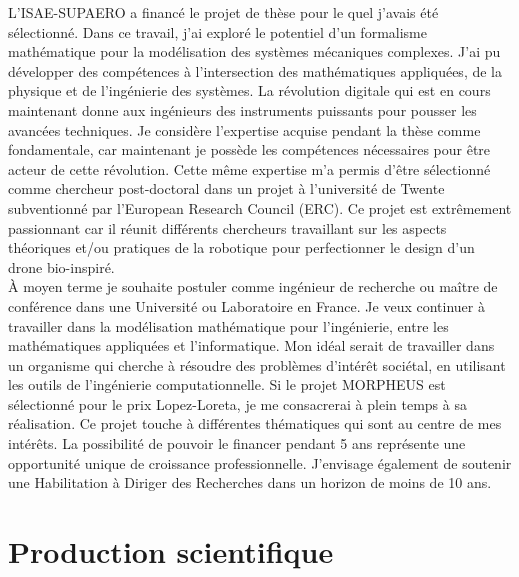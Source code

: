 \documentclass[12pt, french]{article}
\begin{document}
	L'ISAE-SUPAERO a financé le projet de thèse pour le quel j'avais été sélectionné. Dans ce travail, j'ai exploré le potentiel d'un formalisme mathématique pour la modélisation des systèmes mécaniques complexes. J'ai pu développer des compétences à l'intersection des mathématiques appliquées, de la physique et de l'ingénierie des systèmes. La révolution digitale qui est en cours maintenant donne aux ingénieurs des instruments puissants pour pousser les avancées techniques. Je considère l'expertise acquise pendant la thèse comme fondamentale, car maintenant je possède les compétences nécessaires pour être acteur de cette révolution. Cette même expertise m'a permis d'être sélectionné comme chercheur post-doctoral dans un projet à l'université de Twente subventionné par l'European Research Council (ERC). Ce projet est extrêmement passionnant car il réunit différents chercheurs travaillant sur les aspects théoriques et/ou pratiques de la robotique pour perfectionner le design d'un drone bio-inspiré. \\
	
	\`A moyen terme je souhaite postuler comme ingénieur de recherche ou maître de conférence dans une Université ou Laboratoire en France. Je veux continuer à travailler dans la modélisation mathématique pour l'ingénierie, entre les mathématiques appliquées et l'informatique. Mon idéal serait de travailler dans un organisme qui cherche à résoudre des problèmes d'intérêt sociétal, en utilisant les outils de l'ingénierie computationnelle.  Si le projet MORPHEUS est sélectionné pour le prix Lopez-Loreta, je me consacrerai à plein temps à sa réalisation. Ce projet touche à différentes thématiques qui sont au centre de mes intérêts. La possibilité de pouvoir le financer pendant 5 ans représente une opportunité unique de croissance professionnelle. J'envisage également de soutenir une Habilitation à Diriger des Recherches dans un horizon de moins de 10 ans.
	
	
	\section{Production scientifique}
	{
		
		
	}
	
\end{document}
